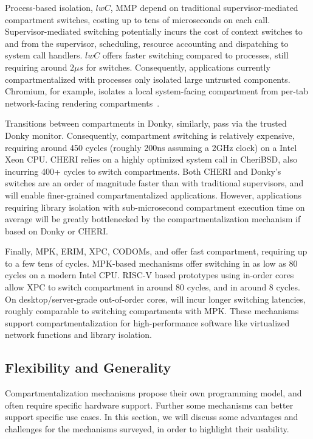 Process-based isolation, $lwC$, MMP depend on traditional supervisor-mediated
compartment switches, costing up to tens of microseconds on each call.
Supervisor-mediated switching potentially incurs the cost of context switches
to and from the supervisor, scheduling, resource accounting and dispatching
to system call handlers.
$lwC$ offers faster switching compared to processes, still requiring around
$2\mu{}s$ for switches.
Consequently, applications currently compartmentalized with processes 
only isolated large untrusted components.
Chromium, for example, isolates a local system-facing compartment from 
per-tab network-facing rendering compartments~\cite{barth2008security}.

Transitions between compartments in Donky, similarly, pass via the trusted
Donky monitor.
Consequently, compartment switching is relatively expensive, requiring
around 450 cycles (roughly 200ns assuming a 2GHz clock) on a Intel Xeon CPU.
CHERI relies on a highly optimized system call in CheriBSD, also incurring
400+ cycles to switch compartments.
Both CHERI and Donky's switches are an order of magnitude faster than
with traditional supervisors, and will enable finer-grained compartmentalized
applications.
However, applications requiring library isolation with sub-microsecond
compartment execution time on average will be greatly bottlenecked by the
compartmentalization mechanism if based on Donky or CHERI.

Finally, MPK, ERIM, XPC, CODOMs, and \seccells offer fast compartment,
requiring up to a few tens of cycles.
MPK-based mechanisms offer switching in as low as 80 cycles on a modern
Intel CPU.
RISC-V based prototypes using in-order cores allow XPC to switch 
compartment in around 80 cycles, and \seccells in around 8 cycles.
On desktop/server-grade out-of-order cores, \seccells will incur longer
switching latencies, roughly comparable to switching compartments with
MPK.
These mechanisms support compartmentalization for high-performance
software like virtualized network functions and library isolation.

\subsection{Flexibility and Generality}
Compartmentalization mechanisms propose their own programming model, and
often require specific hardware support.
Further some mechanisms can better support specific use cases.
In this section, we will discuss some advantages and challenges for
the mechanisms surveyed, in order to highlight their usability.

